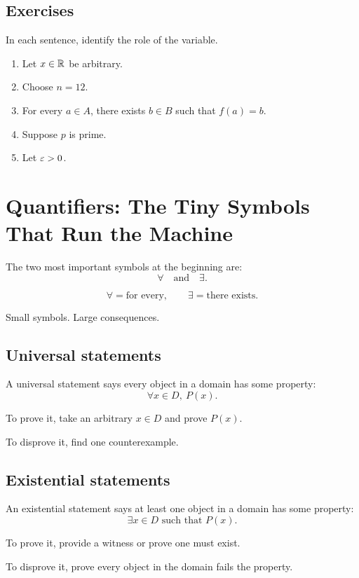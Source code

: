 \documentclass[11pt]{article}
\begin{document}
\subsection{Exercises}

In each sentence, identify the role of the variable.

\begin{enumerate}
\item Let $x\in\mathbb{R}$ be arbitrary.
\item Choose $n=12$.
\item For every $a\in A$, there exists $b\in B$ such that $f(a)=b$.
\item Suppose $p$ is prime.
\item Let $\varepsilon>0$.
\end{enumerate}

\newpage
\section{Quantifiers: The Tiny Symbols That Run the Machine}

The two most important symbols at the beginning are:
\[
\forall \quad \text{and} \quad \exists.
\]

\[
\forall = \text{for every}, \qquad \exists = \text{there exists}.
\]

Small symbols. Large consequences.

\subsection{Universal statements}

A universal statement says every object in a domain has some property:
\[
\forall x\in D,\ P(x).
\]

To prove it, take an arbitrary $x\in D$ and prove $P(x)$.

To disprove it, find one counterexample.

\subsection{Existential statements}

An existential statement says at least one object in a domain has some property:
\[
\exists x\in D \text{ such that } P(x).
\]

To prove it, provide a witness or prove one must exist.

To disprove it, prove every object in the domain fails the property.
\end{document}
